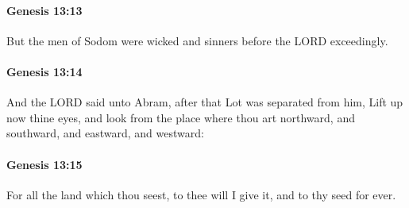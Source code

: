 		\paragraph{Genesis 13:13} %
			\label{GENESIS-13-13}

			But the men of Sodom were wicked and sinners before the LORD exceedingly.


		\paragraph{Genesis 13:14} %
			\label{GENESIS-13-14}

			And the LORD said unto Abram, after that Lot was separated from him, Lift up now thine eyes, and look from the place where thou art northward, and southward, and eastward, and westward:


		\paragraph{Genesis 13:15} %
			\label{GENESIS-13-15}

			For all the land which thou seest, to thee will I give it, and to thy seed for ever.


